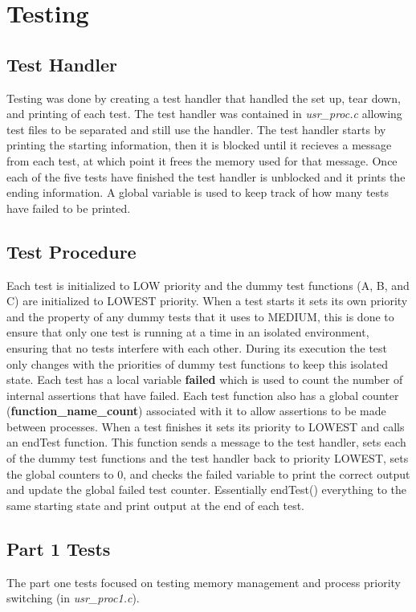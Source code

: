 \documentclass[11pt, oneside]{article}
\begin{document}
\section{Testing}

\subsection{Test Handler}
Testing was done by creating a test handler that handled the set up, tear down, and printing of each test. The test handler was contained in \textit{usr\_proc.c} allowing test files to be separated and still use the handler. The test handler starts by printing the starting information, then it is blocked until it recieves a message from each test, at which point it frees the memory used for that message. Once each of the five tests have finished the test handler is unblocked and it prints the ending information. A global variable is used to keep track of how many tests have failed to be printed.

\subsection{Test Procedure} Each test is initialized to LOW priority and the dummy test functions (A, B, and C) are initialized to LOWEST priority. When a test starts it sets its own priority and the property of any dummy tests that it uses to MEDIUM, this is done to ensure that only one test is running at a time in an isolated environment, ensuring that no tests interfere with each other. During its execution the test only changes with the priorities of dummy test functions to keep this isolated state. Each test has a local variable \textbf{failed} which is used to count the number of internal assertions that have failed. Each test function also has a global counter (\textbf{function\_name\_count}) associated with it to allow assertions to be made between processes. When a test finishes it sets its priority to LOWEST and calls an endTest function. This function sends a message to the test handler, sets each of the dummy test functions and the test handler back to priority LOWEST, sets the global counters to 0, and checks the failed variable to print the correct output and update the global failed test counter. Essentially endTest() everything to the same starting state and print output at the end of each test.

\subsection{Part 1 Tests}
The part one tests focused on testing memory management and process priority switching (in \textit{usr\_proc1.c}).
\end{document}
